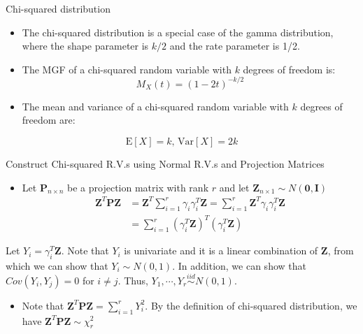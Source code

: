 \documentclass[
  ignorenonframetext,
]{beamer}
\providecommand{\tightlist}{%
  \setlength{\itemsep}{0pt}\setlength{\parskip}{0pt}}
\begin{document}
\begin{frame}{Chi-squared distribution}
\protect\hypertarget{chi-squared-distribution-1}{}
\begin{itemize}
\item
  The chi-squared distribution is a special case of the gamma
  distribution, where the shape parameter is \(k/2\) and the rate
  parameter is 1/2.
\item
  The MGF of a chi-squared random variable with \(k\) degrees of freedom
  is: \[
  M_X(t) = (1-2t)^{-k/2}
  \]
\item
  The mean and variance of a chi-squared random variable with \(k\)
  degrees of freedom are:
\end{itemize}

\[\text{E}[X] = k \mbox{, }\text{Var}[X] = 2k\]
\end{frame}

\begin{frame}{Construct Chi-squared R.V.s using Normal R.V.s and
Projection Matrices}
\protect\hypertarget{construct-chi-squared-r.v.s-using-normal-r.v.s-and-projection-matrices}{}
\begin{itemize}
\tightlist
\item
  Let \(\mathbf P_{n\times n}\) be a projection matrix with rank \(r\)
  and let \(\mathbf Z_{n\times 1}\sim N(\mathbf 0, \mathbf I)\) \[
  \begin{aligned}
  \mathbf Z^T \mathbf P \mathbf Z &= \mathbf Z^T \sum_{i=1}^r \gamma_i \gamma_i^T \mathbf Z= \sum_{i=1}^r \mathbf Z^T \gamma_i \gamma_i^T \mathbf Z\\
  &= \sum_{i=1}^r (\gamma_i^T \mathbf Z)^T(\gamma_i^T \mathbf Z)
  \end{aligned}
  \]
\end{itemize}

Let \(Y_i = \gamma_i^T \mathbf Z\). Note that \(Y_i\) is univariate and
it is a linear combination of \(\mathbf Z\), from which we can show that
\(Y_i \sim N(0, 1)\). In addition, we can show that \(Cov(Y_i, Y_j)=0\)
for \(i\not=j\). Thus, \(Y_1, \cdots, Y_r\overset{iid}\sim N(0,1)\).

\begin{itemize}
\tightlist
\item
  Note that \(\mathbf Z^T \mathbf P \mathbf Z=\sum_{i=1}^r Y_i^2\). By
  the definition of chi-squared distribution, we have
  \(\mathbf Z^T \mathbf P \mathbf Z\sim \chi_r^2\)
\end{itemize}
\end{frame}
\end{document}
